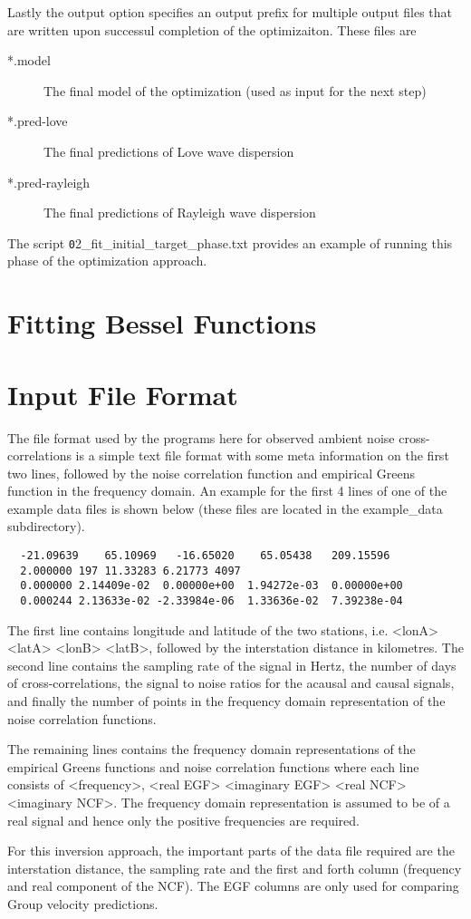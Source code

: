 \documentclass{article}
\begin{document}
Lastly the output option specifies an output prefix for multiple output files
that are written upon successul completion of the optimizaiton. These files
are

\begin{description}
\item[*.model] The final model of the optimization (used as input for the next step)
\item[*.pred-love] The final predictions of Love wave dispersion
\item[*.pred-rayleigh] The final predictions of Rayleigh wave dispersion
\end{description}

The script {\texttt 02\_fit\_initial\_target\_phase.txt} provides an example
of running this phase of the optimization approach.


\section{Fitting Bessel Functions}


\appendix
  
\section{Input File Format}

The file format used by the programs here for observed ambient noise
cross-correlations is a simple text file format with some meta
information on the first two lines, followed by the noise correlation
function and empirical Greens function in the frequency domain.  An
example for the first 4 lines of one of the example data files is
shown below (these files are located in the example\_data
subdirectory).

\begin{verbatim}
  -21.09639    65.10969   -16.65020    65.05438   209.15596
  2.000000 197 11.33283 6.21773 4097
  0.000000 2.14409e-02  0.00000e+00  1.94272e-03  0.00000e+00
  0.000244 2.13633e-02 -2.33984e-06  1.33636e-02  7.39238e-04
\end{verbatim}

The first line contains longitude and latitude of the two stations,
i.e. <lonA> <latA> <lonB> <latB>, followed by the interstation
distance in kilometres. The second line contains the sampling rate of
the signal in Hertz, the number of days of cross-correlations, the
signal to noise ratios for the acausal and causal signals, and finally
the number of points in the frequency domain representation of the
noise correlation functions.

The remaining lines contains the frequency domain representations of
the empirical Greens functions and noise correlation functions where
each line consists of <frequency>, <real EGF> <imaginary EGF> <real
NCF> <imaginary NCF>. The frequency domain representation is assumed
to be of a real signal and hence only the positive frequencies are
required.

For this inversion approach, the important parts of the data file
required are the interstation distance, the sampling rate and the
first and forth column (frequency and real component of the NCF). The
EGF columns are only used for comparing Group velocity predictions.
\end{document}
